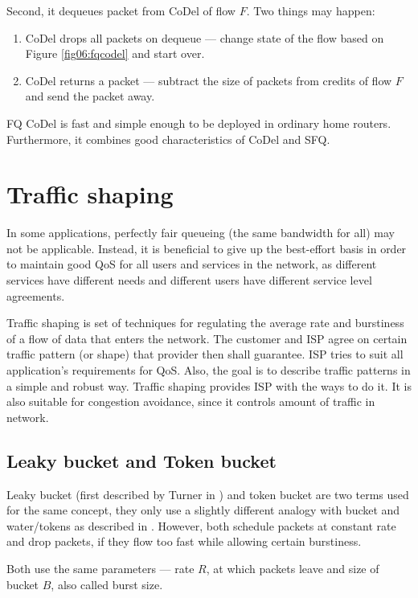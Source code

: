Second, it dequeues packet from CoDel of flow $F$. Two things may happen:
\begin{enumerate}
	\item CoDel drops all packets on dequeue --- change state of the flow based on Figure \ref{fig06:fqcodel} and start over.
	\item CoDel returns a packet --- subtract the size of packets from credits of flow $F$ and send the packet away.
\end{enumerate}

FQ CoDel is fast and simple enough to be deployed in ordinary home routers. Furthermore, it combines good characteristics of CoDel and SFQ.

\section{Traffic shaping}

In some applications, perfectly fair queueing (the same bandwidth for all) may not be applicable. Instead, it is beneficial to give up the best-effort basis in order to maintain good QoS for all users and services in the network, as different services have different needs and different users have different service level agreements. 

Traffic shaping is set of techniques for regulating the average rate and burstiness of a flow of data that enters the network. The customer and ISP agree on certain traffic pattern (or shape) that provider then shall guarantee. ISP tries to suit all application's requirements for QoS. Also, the goal is to describe traffic patterns in a simple and robust way. Traffic shaping provides ISP with the ways to do it. It is also suitable for congestion avoidance, since it controls amount of traffic in network.

\subsection{Leaky bucket and Token bucket}
\label{token_bucket}
Leaky bucket (first described by Turner in \cite{turner1986new}) and token bucket are two terms used for the same concept, they only use a slightly different analogy with bucket and water/tokens as described in \cite[Section 5.4.2]{Tanenbaum:2002:CN:572404}. However, both schedule packets at constant rate and drop packets, if they flow too fast while allowing certain burstiness.

Both use the same parameters --- rate $R$, at which packets leave and size of bucket $B$, also called burst size.

